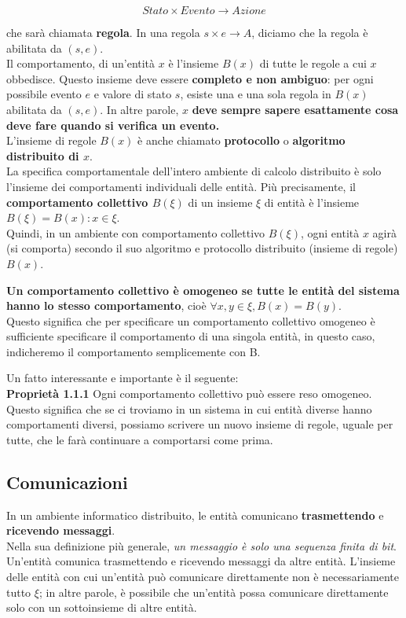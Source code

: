 $$
    Stato \times Evento \rightarrow Azione
$$

che sarà chiamata \textbf{regola}. In una regola $s \times e \rightarrow A$,
diciamo che la regola è abilitata da $(s, e)$.\\
Il comportamento, di un'entità $x$ è l'insieme $B(x)$ di tutte le regole a cui
$x$ obbedisce. Questo insieme deve essere \textbf{completo e non ambiguo}: per
ogni possibile evento $e$ e valore di stato $s$, esiste una e una sola regola in
$B(x)$ abilitata da $(s,e)$. In altre parole, $x$ \textbf{deve sempre sapere
    esattamente cosa deve fare quando si verifica un evento.}\\
L'insieme di regole $B(x)$ è anche chiamato \textbf{protocollo} o
\textbf{algoritmo distribuito di $x$}.\\
La specifica comportamentale dell'intero ambiente di calcolo distribuito è solo
l'insieme dei comportamenti individuali delle entità. Più precisamente, il
\textbf{comportamento collettivo $B(\xi)$} di un insieme $\xi$ di entità è
l'insieme $B(\xi) = {B(x): x \in \xi}$.\\
Quindi, in un ambiente con comportamento collettivo $B(\xi)$, ogni entità $x$
agirà (si comporta) secondo il suo algoritmo e protocollo distribuito (insieme
di regole) $B(x)$.

\textbf{Un comportamento collettivo è omogeneo se tutte le entità del sistema
    hanno lo stesso comportamento}, cioè $\forall x, y \in \xi, B(x) = B(y)$.\\
Questo significa che per specificare un comportamento collettivo omogeneo è
sufficiente specificare il comportamento di una singola entità, in questo caso,
indicheremo il comportamento semplicemente con B.

Un fatto interessante e importante è il seguente:\\
\textbf{Proprietà 1.1.1} Ogni comportamento collettivo può essere reso
omogeneo.\\
Questo significa che se ci troviamo in un sistema in cui entità diverse hanno
comportamenti diversi, possiamo scrivere un nuovo insieme di regole, uguale per
tutte, che le farà continuare a comportarsi come prima.

\subsection{Comunicazioni}
In un ambiente informatico distribuito, le entità comunicano
\textbf{trasmettendo} e \textbf{ricevendo messaggi}.\\
Nella sua definizione più generale, \textit{un messaggio è solo una sequenza
    finita di bit}.\\
Un'entità comunica trasmettendo e ricevendo messaggi da altre entità. L'insieme
delle entità con cui un'entità può comunicare direttamente non è necessariamente
tutto $\xi$; in altre parole, è possibile che un'entità possa comunicare
direttamente solo con un sottoinsieme di altre entità.

